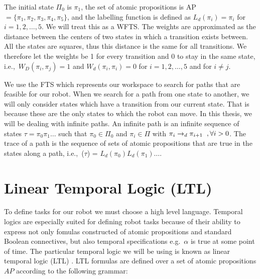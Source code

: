 The initial state $\Pi_0$ is $\pi_1$, the set of atomic propositions is AP $=\{\pi_1,\pi_2,\pi_3,\pi_4,\pi_5\}$, and the labelling function is defined as $L_d(\pi_i) = \pi_i$ for $i=1,2,\dots,5$. We will treat this as a WFTS. The weights are approximated as the distance between the centers of two states in which a transition exists between. All the states are squares, thus this distance is the same for all transitions. We therefore let the weights be 1 for every transition and 0 to stay in the same state, i.e.,\ $W_D(\pi_i, \pi_j) = 1$ and $W_d(\pi_i,\pi_i)=0$ for $i=1,2,\dots,5$ and for $i \neq j$.


We use the FTS which represents our workspace to search for paths that are feasible for our robot. When we search for a path from one state to another, we will only consider states which have a transition from our current state. That is because these are the only states to which the robot can move. In this thesis, we will be dealing with infinite paths. An infinite path is an infinite sequence of states $\tau = \pi_0 \pi_1 \dots$ such that $\pi_0 \in \Pi_0$ and $\pi_i \in \Pi$ with $\pi_{i} \rightarrow_d \pi_{i+1} \hspace{0.2cm}, \forall i > 0$. The trace of a path is the sequence of sets of atomic propositions that are true in the states along a path, i.e.,\ \trace($\tau$) = $L_d(\pi_0) L_d(\pi_1) \dots$.   %


\section{Linear Temporal Logic (LTL)}
To define tasks for our robot we must choose a high level language. Temporal logics are especially suited for defining robot tasks because of their ability to express not only fomulas constructed of atomic propositions and standard Boolean connectives, but also temporal specifications e.g.\ $\alpha$ is true at some point of time. The particular temporal logic we will be using is known as linear temporal logic (LTL) \cite{clarke99}. LTL formulas are defined over a set of atomic propositions $AP$ according to the following grammar: %

